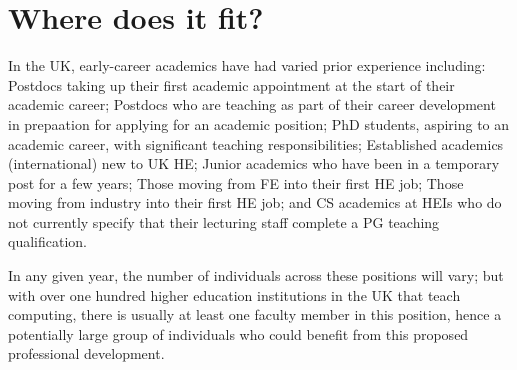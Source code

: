 \documentclass[sigconf]{acmart}
\begin{document}
\begin{comment}
This paper summaries an initiative to date to explore the potential to supplement the existing initiatives with further regional and national-level training and development opportunities for early-career computer science academics.
\end{comment}

\section{Where does it fit?}
In the UK, early-career academics have had varied prior experience including: Postdocs taking up their first academic appointment at the start of their academic career;
Postdocs who are teaching as part of their career development in prepaation for applying for an academic position;
PhD students, aspiring to an academic career, with significant teaching responsibilities;
Established academics (international) new to UK HE;
Junior academics who have been in a temporary post for a few years;
Those moving from FE into their first HE job;
 Those moving from industry into their first HE job;
and CS academics at HEIs who do not currently specify that their lecturing staff complete a PG teaching qualification.


In any given year, the number of individuals across these positions will vary; but with over one hundred higher education institutions in the UK that teach computing, there is usually at least one faculty member in this position, hence a potentially large group of individuals who could benefit from this proposed professional development.

\begin{comment}
For the pilot phase of this programme (which will run in December 2020), a training course will be run for early-career academics based at the institutions of those who are members of the steering committee. The training programme follows a blended approach consisting of synchronous online sessions supported with the availability of the material on a supporting website. The programming includes live virtual sessions presented by colleagues from UK computer science departments. The sessions will be practical in nature, and includes pedagogical groundings, the sharing of best practice, how to developing good practice, and (perhaps more importantly) the sharing of ``what to avoid doing''. The intention is to supplement the programme with the provision of cross-institution mentoring at the local and regional level.
\end{comment}
\end{document}
